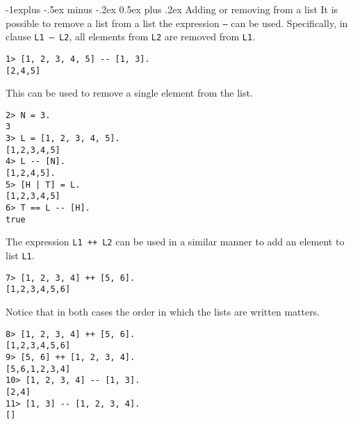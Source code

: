 \documentclass[10pt,landscape]{article}
\makeatletter
\renewcommand{\subsection}{\@startsection{subsection}{2}{0mm}%
                                {-1explus -.5ex minus -.2ex}%
                                {0.5ex plus .2ex}%
                                {\normalfont\normalsize\bfseries}}
\makeatother
\begin{document}
\begin{multicols}{3}
\subsection{Adding or removing from a list}
It is possible to remove a list from a list the expression \texttt{--} can be used. Specifically, in clause \texttt{L1 -- L2}, all elements from \texttt{L2} are removed from \texttt{L1}.
\begin{verbatim}
1> [1, 2, 3, 4, 5] -- [1, 3].
[2,4,5]
\end{verbatim}
This can be used to remove a single element from the list.
\begin{verbatim}
2> N = 3.
3
3> L = [1, 2, 3, 4, 5].
[1,2,3,4,5]
4> L -- [N].
[1,2,4,5].
5> [H | T] = L.
[1,2,3,4,5]
6> T == L -- [H].
true
\end{verbatim}
The expression \texttt{L1 ++ L2} can be used in a similar manner to add an element to list \texttt{L1}.
\begin{verbatim}
7> [1, 2, 3, 4] ++ [5, 6].
[1,2,3,4,5,6]
\end{verbatim}
Notice that in both cases the order in which the lists are written matters.
\begin{verbatim}
8> [1, 2, 3, 4] ++ [5, 6].
[1,2,3,4,5,6]
9> [5, 6] ++ [1, 2, 3, 4].
[5,6,1,2,3,4]
10> [1, 2, 3, 4] -- [1, 3].
[2,4]
11> [1, 3] -- [1, 2, 3, 4].
[]
\end{verbatim}

\end{multicols}
\end{document}
